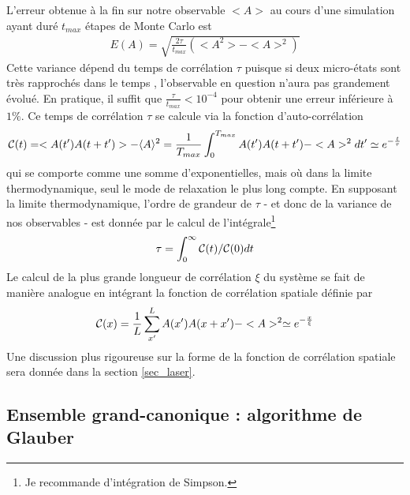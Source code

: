 L'erreur obtenue à la fin sur notre observable $<A>$ au cours d'une simulation ayant duré $t_{max}$ étapes de Monte Carlo est 
\begin{align}
	E(A) = \sqrt{\frac{2 \tau}{t_{max}} (<A^2>-<A>^2)} 
\end{align}
Cette variance dépend du temps de corrélation $\tau$ puisque si deux micro-états sont très rapprochés dans le temps , l'observable en question n'aura pas grandement évolué. En pratique, il suffit que $\frac{\tau}{t_{max}} \less 10^{-4}$ pour obtenir une erreur inférieure à $1\%$. Ce temps de corrélation $\tau$ se calcule via la fonction d'auto-corrélation 
\begin{align}
\mathcal{C}(t) = <A(t')A(t+t')>-\langle A \rangle^2 = \frac{1}{T_{max}}\int_0^{T_{max}}A(t')A(t+t')-<A>^2 dt' \simeq e^{-\frac{t}{\tau}}
\end{align}
qui se comporte comme une somme d'exponentielles, mais où dans la limite thermodynamique, seul le mode de relaxation le plus long compte\cite{wansleben_monte_1991}. En supposant la limite thermodynamique, l'ordre de grandeur de $\tau$ - et donc de la variance de nos observables - est donnée par le calcul de l'intégrale\footnote{Je recommande d'intégration de Simpson.}
\begin{align}
	\tau = \int_0^{\infty} \mathcal{C}(t)/\mathcal{C}(0) dt
	\label{tau_cor}
\end{align}
Le calcul de la plus grande longueur de corrélation $\xi$ du système se fait de manière analogue en intégrant la fonction de corrélation spatiale définie par
\begin{align}
\mathcal{C}(x) = \frac{1}{L} \sum_{x'}^L A(x')A(x+x')-<A>^2 \simeq e^{-\frac{x}{\xi}}
\end{align}
Une discussion plus rigoureuse sur la forme de la fonction de corrélation spatiale sera donnée dans la section \ref{sec_laser}.

	\subsection{Ensemble grand-canonique : algorithme de Glauber}

